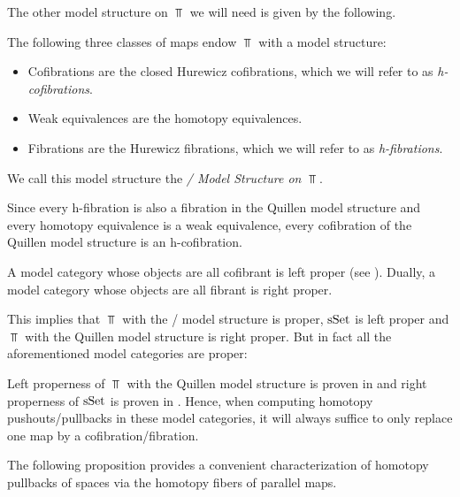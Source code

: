 The other model structure on $\Top$ we will need is given by the following.
\begin{thm}\label{thm:stromModelStructure}
    The following three classes of maps endow $\Top$ with a model structure:
    \begin{itemize}
        \item Cofibrations are the closed Hurewicz cofibrations, which we will refer to as \emph{h-cofibrations}.
        \item Weak equivalences are the homotopy equivalences.
        \item Fibrations are the Hurewicz fibrations, which we will refer to as \emph{h-fibrations}.
    \end{itemize}
    We call this model structure the \emph{\Strom/ Model Structure on $\Top$}.
    \begin{reference}
       \cite{Strom1972} %
    \end{reference}
\end{thm}
\begin{remark}
    Since every h-fibration is also a fibration in the Quillen model structure and every homotopy equivalence is a weak equivalence, every cofibration of the Quillen model structure is an h-cofibration. %
\end{remark}
\begin{remark}[Properness] 
    A model category whose objects are all cofibrant is left proper (see \cite[Proposition A.2.4.2]{HTT}).
    Dually, a model category whose objects are all fibrant is right proper.
    
    This implies that $\Top$ with the \Strom/ model structure is proper, $\operatorname{sSet}$ is left proper and $\Top$ with the Quillen model structure is right proper.
    But in fact all the aforementioned model categories are proper:

    Left properness of $\Top$ with the Quillen model structure is proven in \cite[Theorem 13.1.10]{hirschhorn2003model} and right properness of $\operatorname{sSet}$ is proven in \cite[Theorem 13.1.13]{hirschhorn2003model}.
    Hence, when computing homotopy pushouts/pullbacks in these model categories, it will always suffice to only replace one map by a cofibration/fibration.
\end{remark}
The following proposition provides a convenient characterization of homotopy pullbacks of spaces via the homotopy fibers of parallel maps.
